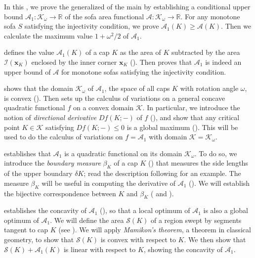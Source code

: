 In this , we prove the generalized  of the main  by establishing a conditional upper bound \(\mathcal{A}_1 : \mathcal{K}_\omega \to \mathbb{R}\) of the sofa area functional \(\mathcal{A} : \mathcal{K}_\omega \to \mathbb{R}\). For any monotone sofa \(S\) satisfying the injectivity condition, we prove \(\mathcal{A}_1(K) \geq \mathcal{A}(K)\). Then we calculate the maximum value \(1 + \omega^2/2\) of \(\mathcal{A}_1\).

 defines the value \(\mathcal{A}_1(K)\) of a cap \(K\) as the area of \(K\) subtracted by the area \(\mathcal{I}(\mathbf{x}_K)\) enclosed by the inner corner \(\mathbf{x}_K\) (). Then  proves that \(\mathcal{A}_1\) is indeed an upper bound of \(\mathcal{A}\) for monotone sofas satisfying the injectivity condition.

 shows that the domain \(\mathcal{K}_\omega\) of \(\mathcal{A}_1\), the space of all caps \(K\) with rotation angle \(\omega\), is convex (). Then  sets up the calculus of variations on a general concave quadratic functional \(f\) on a convex domain \(\mathcal{K}\). In particular, we introduce the notion of \emph{directional derivative} \(Df(K; -)\) of \(f\) (), and show that any critical point \(K \in \mathcal{K}\) satisfying \(D f(K; -) \leq 0\) is a global maximum (). This will be used to do the calculus of variations on \(f = \mathcal{A}_1\) with domain \(\mathcal{K} = \mathcal{K}_\omega\).

 establishes that \(\mathcal{A}_1\) is a quadratic functional on its domain \(\mathcal{K}_\omega\). To do so, we introduce the \emph{boundary measure} \(\beta_K\) of a cap \(K\) () that measures the side lengths of the upper boundary \(\delta K\); read the description following  for an example. The measure \(\beta_K\) will be useful in computing the derivative of \(\mathcal{A}_1\) (). We will establish the bijective correspondence between \(K\) and \(\beta_K\) ( and ).

 establishes the concavity of \(\mathcal{A}_1\) (), so that a local optimum of \(\mathcal{A}_1\) is also a global optimum of \(\mathcal{A}_1\). We will define the area \(\mathcal{S}(K)\) of a region swept by segments tangent to cap \(K\) (see ). We will apply \emph{Mamikon’s theorem}, a theorem in classical geometry, to show that \(\mathcal{S}(K)\) is convex with respect to \(K\). We then show that \(\mathcal{S}(K) + \mathcal{A}_1(K)\) is linear with respect to \(K\), showing the concavity of \(\mathcal{A}_1\).

